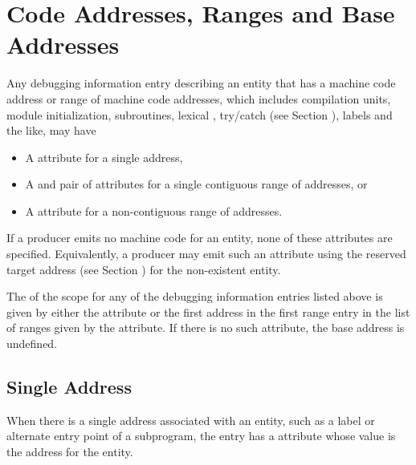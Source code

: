 \section{Code Addresses, Ranges and Base Addresses}
\label{chap:codeaddressesandranges}
Any debugging information entry describing an entity that has
a machine code address or range of machine code addresses,
which includes compilation units, module initialization,
subroutines, lexical ,
try/catch  (see Section ),
labels and the like, may have
\begin{itemize}
\item \hypertarget{chap:DWATlowpccodeaddressorrangeofaddresses}{}
A \DWATlowpcDEFN{} attribute for a single address,

\item \hypertarget{chap:DWAThighpccontiguousrangeofcodeaddresses}{}
A \DWATlowpcDEFN{}
and \DWAThighpcDEFN{}
pair of attributes for a single contiguous range of
addresses, or

\item \hypertarget{chap:DWATrangesnoncontiguousrangeofcodeaddresses}{}
A \DWATrangesDEFN{} attribute
for a non-contiguous range of addresses.
\end{itemize}

\bb
If a producer emits no machine code for an entity, none of these
attributes are specified. Equivalently, a producer may emit such an
attribute using the reserved target address (see Section
) for the non-existent entity.
\eb

The  of the scope for any of the
debugging information entries listed above is given by either the
\DWATlowpcNAME{}
attribute or the first address in the first range entry
in the list of ranges given by the \DWATrangesNAME{} attribute.
If there is no such attribute, the base address is undefined.

\subsection{Single Address}
\label{chap:singleaddress}
When there is a single address associated with an entity,
such as a label or alternate entry point of a subprogram,
the entry has a \DWATlowpc{} attribute whose value is the
address for the entity.

